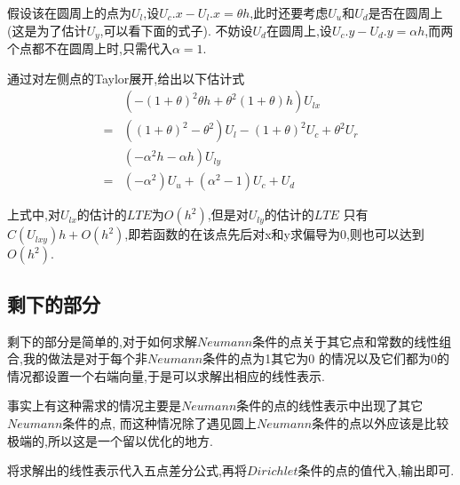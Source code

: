 假设该在圆周上的点为$U_l$,设$U_c.x-U_l.x=\theta h$,此时还要考虑$U_u$和$U_d$是否在圆周上(这是为了估计$U_y$,可以看下面的式子).
不妨设$U_d$在圆周上,设$U_c.y-U_d.y=\alpha h$,而两个点都不在圆周上时,只需代入$\alpha=1$.

通过对左侧点的Taylor展开,给出以下估计式
\begin{align*}
    &(-(1+\theta)^2\theta h +\theta^2 (1+\theta) h)U_{lx}\\
    =&((1+\theta)^2-\theta^2)U_l-(1+\theta)^2 U_c +\theta^2 U_r\\
    &(-\alpha^2 h-\alpha h)U_{ly}\\
    =&(-\alpha^2)U_u+(\alpha^2-1)U_c+U_d
\end{align*}

上式中,对$U_{lx}$的估计的$LTE$为$O(h^2)$,但是对$U_{ly}$的估计的$LTE$
只有$C(U_{lxy})h+O(h^2)$,即若函数的在该点先后对x和y求偏导为0,则也可以达到$O(h^2)$.

\subsection{剩下的部分}

剩下的部分是简单的,对于如何求解$Neumann$条件的点关于其它点和常数的线性组合,我的做法是对于每个非$Neumann$条件的点为1其它为0
的情况以及它们都为0的情况都设置一个右端向量,于是可以求解出相应的线性表示.

事实上有这种需求的情况主要是$Neumann$条件的点的线性表示中出现了其它$Neumann$条件的点,
而这种情况除了遇见圆上$Neumann$条件的点以外应该是比较极端的,所以这是一个留以优化的地方.

将求解出的线性表示代入五点差分公式,再将$Dirichlet$条件的点的值代入,输出即可.